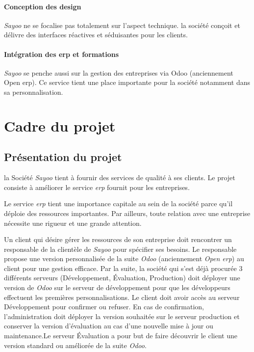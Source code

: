 \begin{onehalfspace}
\paragraph*{Conception des design}
\emph{Sayoo} ne se focalise pas totalement sur l'aspect technique. la société conçoit et délivre des interfaces réactives et séduisantes pour les clients.

\paragraph*{Intégration des \acrshort{erp} et formations}
\emph{Sayoo} se penche aussi sur la gestion des entreprises via Odoo (anciennement Open \acrshort{erp}). Ce service tient une place importante pour la société notamment dans sa personnalisation.

\section{Cadre du projet}


\subsection{Présentation du projet}
 
la Société \emph{Sayoo} tient à fournir des services de qualité à ses clients. Le projet consiste à améliorer le service \emph{\acrshort{erp}} fournit pour les entreprises.

Le service \emph{\acrshort{erp}} tient une importance capitale au sein de la société parce qu'il déploie des ressources importantes. Par ailleurs, toute relation avec une entreprise nécessite une rigueur et une grande attention.

Un client qui désire gérer les ressources de son entreprise  doit rencontrer un responsable de la clientèle de \emph{Sayoo} pour spécifier ses besoins. Le responsable propose une version personnalisée de la suite \emph{Odoo} (anciennement \emph{Open \acrshort{erp}}) au client pour une gestion efficace. Par la suite, la société qui s'est déjà procurée  3 différents serveurs (Développement, Évaluation, Production) doit déployer une version de \emph{Odoo} sur le serveur de développement pour que les développeurs effectuent les premières personnalisations. Le client doit avoir accès au serveur Développement pour confirmer ou refuser. En cas de confirmation, l'administration doit déployer la version souhaitée sur le serveur production et conserver la version d'évaluation au cas d'une nouvelle mise à jour ou maintenance.Le serveur Évaluation a pour but de faire découvrir le client une version standard ou améliorée de la suite \emph{Odoo}.  


\end{onehalfspace}

